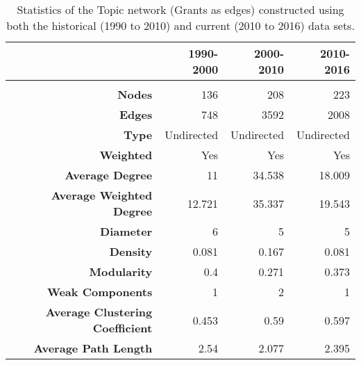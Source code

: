 \begin{table}[!htbp]
\centering
\caption[Statistics of the Topic network (Grants as edges) constructed using both the historical (1990 to 2010) and current (2010 to 2016) data sets.]{Statistics of the Topic network (Grants as edges) constructed using both the historical (1990 to 2010) and current (2010 to 2016) data sets.}
\label{table:topic_a_stats}
\begin{tabular}{r|rrr}
{} & \textbf{1990-2000} & \textbf{2000-2010} & \textbf{2010-2016}\\
\hline\\
\textbf{Nodes}                          & {136}     & {208}     & {223}\\
\textbf{Edges}                          & {748}     & {3592}    & {2008}\\
\textbf{Type}                           & {Undirected} & {Undirected} & {Undirected}\\
\textbf{Weighted}                       & {Yes}     & {Yes}     & {Yes}\\
\textbf{Average Degree}                 & {11}      & {34.538}  & {18.009}\\
\textbf{Average Weighted Degree}        & {12.721}  & {35.337}  & {19.543}\\
\textbf{Diameter}                       & {6}       & {5}       & {5}\\
\textbf{Density}                        & {0.081}   & {0.167}   & {0.081}\\
\textbf{Modularity}                     & {0.4}     & {0.271}   & {0.373}\\
\textbf{Weak Components}                & {1}       & {2}       & {1}\\
\textbf{Average Clustering Coefficient} & {0.453}   & {0.59}    & {0.597}\\
\textbf{Average Path Length}            & {2.54}    & {2.077}   & {2.395}\\
\end{tabular}
\end{table}

